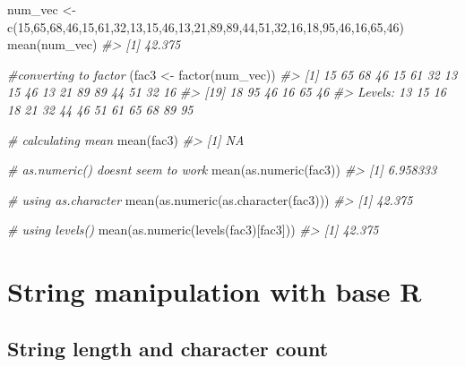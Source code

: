 \documentclass[
]{book}
\newenvironment{Shaded}{\begin{snugshade}}{\end{snugshade}}
\newcommand{\CommentTok}[1]{\textcolor[rgb]{0.56,0.35,0.01}{\textit{#1}}}
\newcommand{\DecValTok}[1]{\textcolor[rgb]{0.00,0.00,0.81}{#1}}
\newcommand{\FunctionTok}[1]{\textcolor[rgb]{0.00,0.00,0.00}{#1}}
\newcommand{\NormalTok}[1]{#1}
\newcommand{\OtherTok}[1]{\textcolor[rgb]{0.56,0.35,0.01}{#1}}
\begin{document}
\begin{Shaded}
\begin{Highlighting}[]
\NormalTok{num\_vec }\OtherTok{\textless{}{-}} \FunctionTok{c}\NormalTok{(}\DecValTok{15}\NormalTok{,}\DecValTok{65}\NormalTok{,}\DecValTok{68}\NormalTok{,}\DecValTok{46}\NormalTok{,}\DecValTok{15}\NormalTok{,}\DecValTok{61}\NormalTok{,}\DecValTok{32}\NormalTok{,}\DecValTok{13}\NormalTok{,}\DecValTok{15}\NormalTok{,}\DecValTok{46}\NormalTok{,}\DecValTok{13}\NormalTok{,}\DecValTok{21}\NormalTok{,}\DecValTok{89}\NormalTok{,}\DecValTok{89}\NormalTok{,}\DecValTok{44}\NormalTok{,}\DecValTok{51}\NormalTok{,}\DecValTok{32}\NormalTok{,}\DecValTok{16}\NormalTok{,}\DecValTok{18}\NormalTok{,}\DecValTok{95}\NormalTok{,}\DecValTok{46}\NormalTok{,}\DecValTok{16}\NormalTok{,}\DecValTok{65}\NormalTok{,}\DecValTok{46}\NormalTok{)}
\FunctionTok{mean}\NormalTok{(num\_vec)}
\CommentTok{\#\textgreater{} [1] 42.375}

\CommentTok{\#converting to factor}
\NormalTok{(fac3 }\OtherTok{\textless{}{-}} \FunctionTok{factor}\NormalTok{(num\_vec))}
\CommentTok{\#\textgreater{}  [1] 15 65 68 46 15 61 32 13 15 46 13 21 89 89 44 51 32 16}
\CommentTok{\#\textgreater{} [19] 18 95 46 16 65 46}
\CommentTok{\#\textgreater{} Levels: 13 15 16 18 21 32 44 46 51 61 65 68 89 95}

\CommentTok{\# calculating mean}
\FunctionTok{mean}\NormalTok{(fac3)}
\CommentTok{\#\textgreater{} [1] NA}


\CommentTok{\# as.numeric() doesn\textquotesingle{}t seem to work }
\FunctionTok{mean}\NormalTok{(}\FunctionTok{as.numeric}\NormalTok{(fac3))}
\CommentTok{\#\textgreater{} [1] 6.958333}


\CommentTok{\# using as.character}
\FunctionTok{mean}\NormalTok{(}\FunctionTok{as.numeric}\NormalTok{(}\FunctionTok{as.character}\NormalTok{(fac3)))}
\CommentTok{\#\textgreater{} [1] 42.375}

\CommentTok{\# using levels()}
\FunctionTok{mean}\NormalTok{(}\FunctionTok{as.numeric}\NormalTok{(}\FunctionTok{levels}\NormalTok{(fac3)[fac3]))}
\CommentTok{\#\textgreater{} [1] 42.375}
\end{Highlighting}
\end{Shaded}

\hypertarget{br-string}{%
\section{String manipulation with base R}\label{br-string}}

\hypertarget{string-length-and-character-count}{%
\subsection{String length and character count}\label{string-length-and-character-count}}
\end{document}
